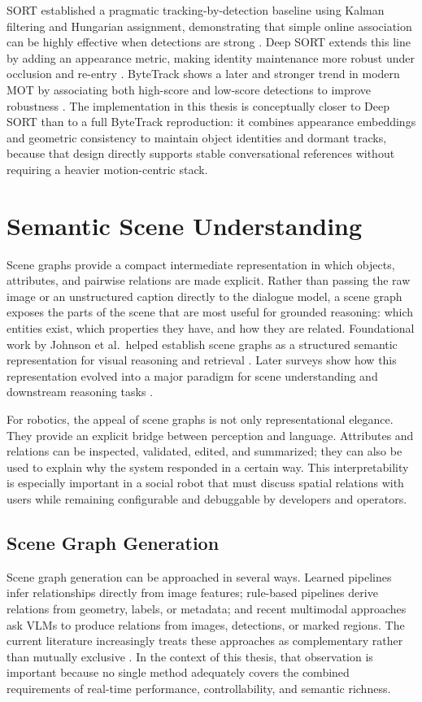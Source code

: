 \documentclass[
  digital,     %
  oneside,     %
  nosansbold,  %
  nocolorbold, %
  lof,         %
  lot,         %
]{fithesis4}
\begin{document}
SORT established a pragmatic tracking-by-detection baseline using Kalman filtering and Hungarian assignment, demonstrating that simple online association can be highly effective when detections are strong \cite{bewley_simple_2016}. Deep SORT extends this line by adding an appearance metric, making identity maintenance more robust under occlusion and re-entry \cite{wojke_simple_2017}. ByteTrack shows a later and stronger trend in modern MOT by associating both high-score and low-score detections to improve robustness \cite{zhang_bytetrack_2022}. The implementation in this thesis is conceptually closer to Deep SORT than to a full ByteTrack reproduction: it combines appearance embeddings and geometric consistency to maintain object identities and dormant tracks, because that design directly supports stable conversational references without requiring a heavier motion-centric stack.

\section{Semantic Scene Understanding}
Scene graphs provide a compact intermediate representation in which objects, attributes, and pairwise relations are made explicit. Rather than passing the raw image or an unstructured caption directly to the dialogue model, a scene graph exposes the parts of the scene that are most useful for grounded reasoning: which entities exist, which properties they have, and how they are related. Foundational work by Johnson et al.\ helped establish scene graphs as a structured semantic representation for visual reasoning and retrieval \cite{johnson_image_2015}. Later surveys show how this representation evolved into a major paradigm for scene understanding and downstream reasoning tasks \cite{zhu_scene_2022, agarwal_visual_2020}.

For robotics, the appeal of scene graphs is not only representational elegance. They provide an explicit bridge between perception and language. Attributes and relations can be inspected, validated, edited, and summarized; they can also be used to explain why the system responded in a certain way. This interpretability is especially important in a social robot that must discuss spatial relations with users while remaining configurable and debuggable by developers and operators.

\subsection{Scene Graph Generation}
Scene graph generation can be approached in several ways. Learned pipelines infer relationships directly from image features; rule-based pipelines derive relations from geometry, labels, or metadata; and recent multimodal approaches ask VLMs to produce relations from images, detections, or marked regions. The current literature increasingly treats these approaches as complementary rather than mutually exclusive \cite{zhu_scene_2022}. In the context of this thesis, that observation is important because no single method adequately covers the combined requirements of real-time performance, controllability, and semantic richness.
\end{document}
